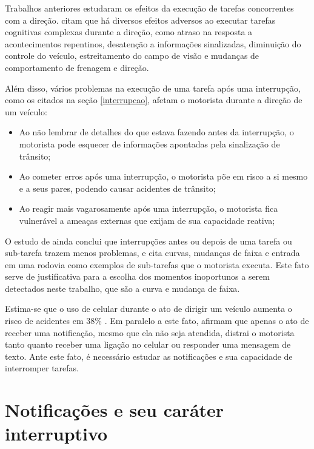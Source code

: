 Trabalhos anteriores estudaram os efeitos da execução de tarefas concorrentes com a direção.  citam
que há diversos efeitos adversos ao executar tarefas cognitivas complexas durante a direção, como atraso na resposta a
acontecimentos repentinos, desatenção a informações sinalizadas, diminuição do controle do veículo, estreitamento do campo
de visão e mudanças de comportamento de frenagem e direção.

Além disso, vários problemas na execução de uma tarefa após uma interrupção, como os citados na seção \ref{interrupcao}, afetam o
motorista durante a direção de um veículo:

\begin{itemize}
  \item Ao não lembrar de detalhes do que estava fazendo antes da interrupção, o motorista pode esquecer de informações
  apontadas pela sinalização de trânsito;
  \item Ao cometer erros após uma interrupção, o motorista põe em risco a si mesmo e a seus pares, podendo causar acidentes
  de trânsito;
  \item Ao reagir mais vagarosamente após uma interrupção, o motorista fica vulnerável a ameaças externas que exijam de sua
  capacidade reativa;
\end{itemize}

O estudo de  ainda conclui que interrupções antes ou depois de uma tarefa ou sub-tarefa trazem
menos problemas, e cita curvas, mudanças de faixa e entrada em uma rodovia como exemplos de sub-tarefas que o motorista executa.
Este fato serve de justificativa para a escolha dos momentos inoportunos a serem detectados neste trabalho, que são a curva
e mudança de faixa.

Estima-se que o uso de celular durante o ato de dirigir um veículo aumenta o risco de acidentes em 38\% \cite{laberge2001wireless}.
Em paralelo a este fato,  afirmam que apenas o ato de receber uma notificação, mesmo que ela não seja
atendida, distrai o motorista tanto quanto receber uma ligação no celular ou responder uma mensagem de texto. Ante este fato, é
necessário estudar as notificações e sua capacidade de interromper tarefas.

\section{Notificações e seu caráter interruptivo}
\label{notificacao}

